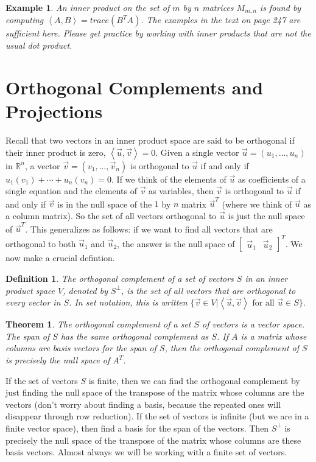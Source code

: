 \documentclass[10pt]{article}
\theoremstyle{plain}
\newtheorem{theorem}{Theorem}\newtheorem*{theorem*}{Theorem}
\theoremstyle{box}
\newtheorem{definition}{Definition}
\newtheorem{example}{Example}
\newcommand{\R}{{\mathbb{R}}}
\begin{document}
\begin{example}
An inner product on the set of $m$ by $n$ matrices $M_{m,n}$ is found by computing $\left<A,B\right>= trace(B^T A)$. The examples in the text on page 247 are sufficient here. Please get practice by working with inner products that are not the usual dot product.
\end{example}






\section{Orthogonal Complements and Projections}
Recall that two vectors in an inner product space are said to be orthogonal if their inner product is zero, $\left<\vec u,\vec v\right>=0$.  Given a single vector $\vec u = (u_1,\ldots,u_n)$ in $\R^n$, a vector $\vec v = (v_1,\ldots,\vec v_n)$ is orthogonal to $\vec u$ if and only if $u_1(v_1)+\cdots +u_n(v_n)=0$. If we think of the elements of $\vec u$ as coefficients of a single equation and the elements of $\vec v$ as variables, then $\vec v$ is orthogonal to $\vec u$ if and only if $\vec v$ is in the null space of the $1$ by $n$ matrix $\vec u^T$ (where we think of $\vec u$ as a column matrix). So the set of all vectors orthogonal to $\vec u$ is just the null space of $\vec u^T$.  This generalizes as follows: if we want to find all vectors that are orthogonal to both $\vec u_1$ and $\vec u_2$, the answer is the null space of $\begin{bmatrix}\vec u_1&\vec u_2\end{bmatrix}^T$. We now make a crucial defintion.

\begin{definition}
The orthogonal complement of a set of vectors $S$ in an inner product space $V$, denoted by $S^\perp$, is the set of all vectors that are orthogonal to every vector in $S$.  In set notation, this is written $\{\vec v\in V | \left<\vec u, \vec v\right> \text{ for all }\vec u\in S\}$.
\end{definition}
\begin{theorem}
The orthogonal complement of a set $S$ of vectors is a vector space. The span of $S$ has the same orthogonal complement as $S$.  If $A$ is a matrix whose columns are basis vectors for the span of $S$, then the orthogonal complement of $S$ is precisely the null space of $A^T$.
\end{theorem}

If the set of vectors $S$ is finite, then we can find the orthogonal complement by just finding the null space of the transpose of the matrix whose columns are the vectors (don't worry about finding a basis, because the repeated ones will disappear through row reduction). If the set of vectors is infinite (but we are in a finite vector space), then find a basis for the span of the vectors.  Then $S^\perp$ is precisely the null space of the transpose of the matrix whose columns are these basis vectors.  Almost always we will be working with a finite set of vectors.
\end{document}
